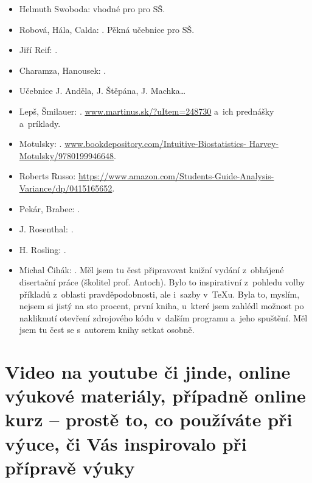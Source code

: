 \begin{itemize}
\item Helmuth Swoboda:  vhodné pro pro SŠ.
\item Robová, Hála, Calda: . Pěkná učebnice pro SŠ.
\item Jiří Reif: .
\item Charamza, Hanousek: .
\item Učebnice J. Anděla, J. Štěpána, J. Machka\ldots
\malskok

\item Lepš, Šmilauer: . \href{https://www.martinus.sk/?uItem=248730}{\url{www.martinus.sk/?uItem=248730}} a~ich prednášky a~príklady.
\item Motulsky: . \href{https://www.bookdepository.com/Intuitive-Biostatistics-Harvey-Motulsky/9780199946648}{\url{www.bookdepository.com/Intuitive-Biostatistics-} \url{Harvey-Motulsky/9780199946648}}.
\item Roberts Russo:  \href{https://www.amazon.com/Students-Guide-Analysis-Variance/dp/0415165652}{\url{https://www.amazon.com/Students-Guide-Analysis-Variance/dp/0415165652}}.
\item Pekár, Brabec: .
\malskok

\item J. Rosenthal: .
\item H. Rosling: .
\malskok

\item Michal Čihák: . Měl jsem tu čest připravovat knižní vydání z~obhájené disertační práce (školitel prof. Antoch). Bylo to inspirativní z~pohledu volby příkladů z~oblasti pravděpodobnosti, ale i~sazby v~\TeX u. Byla to, myslím, nejsem si jistý na sto procent, první kniha, u~které jsem zahlédl možnost po nakliknutí otevření zdrojového kódu v~dalším programu a~jeho spuštění. Měl jsem tu čest se s~autorem knihy setkat osobně.
\maljadro
\end{itemize}


\section{Video na youtube či jinde, online výukové materiály, případně online kurz -- prostě to, co používáte při výuce, či Vás inspirovalo při přípravě výuky}
\smallskip

